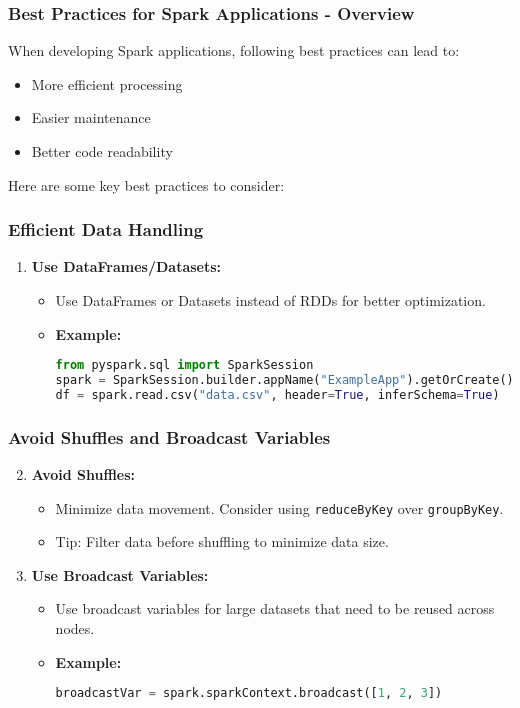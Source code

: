 \documentclass[aspectratio=169]{beamer}
\begin{document}
\begin{frame}[fragile]
    \frametitle{Best Practices for Spark Applications - Overview}
    When developing Spark applications, following best practices can lead to:
    \begin{itemize}
        \item More efficient processing
        \item Easier maintenance
        \item Better code readability
    \end{itemize}
    Here are some key best practices to consider:
\end{frame}

\begin{frame}[fragile]
    \frametitle{Efficient Data Handling}
    \begin{enumerate}
        \item \textbf{Use DataFrames/Datasets:} 
        \begin{itemize}
            \item Use DataFrames or Datasets instead of RDDs for better optimization.
            \item \textbf{Example:}
            \begin{lstlisting}[language=Python]
from pyspark.sql import SparkSession
spark = SparkSession.builder.appName("ExampleApp").getOrCreate()
df = spark.read.csv("data.csv", header=True, inferSchema=True)
            \end{lstlisting}
        \end{itemize}
    \end{enumerate}
\end{frame}

\begin{frame}[fragile]
    \frametitle{Avoid Shuffles and Broadcast Variables}
    \begin{enumerate}
        \setcounter{enumi}{1}
        \item \textbf{Avoid Shuffles:}
        \begin{itemize}
            \item Minimize data movement. Consider using \texttt{reduceByKey} over \texttt{groupByKey}.
            \item Tip: Filter data before shuffling to minimize data size.
        \end{itemize}
        
        \item \textbf{Use Broadcast Variables:}
        \begin{itemize}
            \item Use broadcast variables for large datasets that need to be reused across nodes.
            \item \textbf{Example:}
            \begin{lstlisting}[language=Python]
broadcastVar = spark.sparkContext.broadcast([1, 2, 3])
            \end{lstlisting}
        \end{itemize}
    \end{enumerate}
\end{frame}
\end{document}
